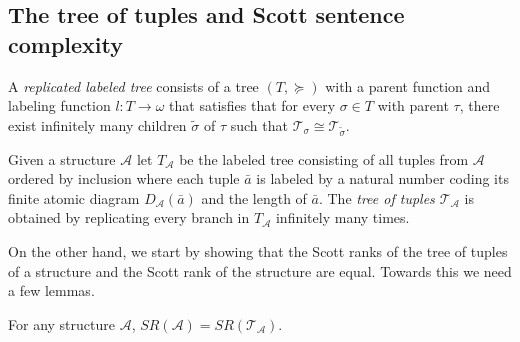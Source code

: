 \documentclass[10pt,a4paper]{amsart}
\providecommand{\A}{\mathcal{A}}
\providecommand{\ba}{\bar a}
\newcommand{\T}{{\mathcal{T}}}
\newcommand{\SR}{SR}
\begin{document}
\subsection{The tree of tuples and Scott sentence complexity}
\begin{definition}\label{def:replabeledtreed}
   A \emph{replicated labeled tree} consists of a tree $(T,\succeq)$ with a parent function and
   labeling function $l:T\to \omega$ that satisfies that for every $\sigma\in T$
   with parent $\tau$, there exist infinitely many children $\tilde\sigma$ of
   $\tau$ such that $\T_\sigma\cong \T_{\tilde\sigma}$.
\end{definition}
\begin{definition}\label{def:tree-of-tuples}
   Given a structure $\A$ let $T_\A$ be the labeled tree consisting of all
   tuples from $\A$ ordered by inclusion where each tuple $\ba$ is labeled by a
   natural number coding its finite atomic diagram $D_\A(\ba)$ and the length of
   $\ba$. The \emph{tree of tuples $\T_\A$} is obtained by replicating every branch in
   $T_\A$ infinitely many times.
  \end{definition}

On the other hand, we start by showing that the Scott ranks of the tree of tuples of a structure
and the Scott rank of the structure are equal. Towards this we need a few
lemmas.

\begin{theorem}\label{thm:treeofstructuressr}
For any structure $\A$, $\SR(\A)=\SR(\T_\A)$. 
\end{theorem}
\end{document}
